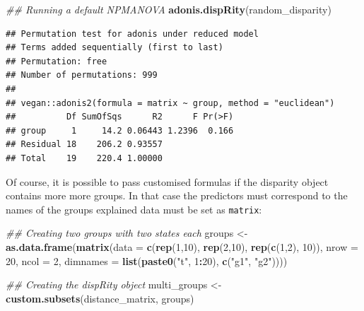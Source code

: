 \documentclass[
]{book}
\newenvironment{Shaded}{\begin{snugshade}}{\end{snugshade}}
\newcommand{\CommentTok}[1]{\textcolor[rgb]{0.56,0.35,0.01}{\textit{#1}}}
\newcommand{\DataTypeTok}[1]{\textcolor[rgb]{0.13,0.29,0.53}{#1}}
\newcommand{\DecValTok}[1]{\textcolor[rgb]{0.00,0.00,0.81}{#1}}
\newcommand{\KeywordTok}[1]{\textcolor[rgb]{0.13,0.29,0.53}{\textbf{#1}}}
\newcommand{\NormalTok}[1]{#1}
\newcommand{\OperatorTok}[1]{\textcolor[rgb]{0.81,0.36,0.00}{\textbf{#1}}}
\newcommand{\StringTok}[1]{\textcolor[rgb]{0.31,0.60,0.02}{#1}}
\begin{document}
\begin{Shaded}
\begin{Highlighting}[]
\CommentTok{\#\# Running a default NPMANOVA}
\KeywordTok{adonis.dispRity}\NormalTok{(random\_disparity)}
\end{Highlighting}
\end{Shaded}

\begin{verbatim}
## Permutation test for adonis under reduced model
## Terms added sequentially (first to last)
## Permutation: free
## Number of permutations: 999
## 
## vegan::adonis2(formula = matrix ~ group, method = "euclidean")
##          Df SumOfSqs      R2      F Pr(>F)
## group     1     14.2 0.06443 1.2396  0.166
## Residual 18    206.2 0.93557              
## Total    19    220.4 1.00000
\end{verbatim}

Of course, it is possible to pass customised formulas if the disparity object contains more more groups.
In that case the predictors must correspond to the names of the groups explained data must be set as \texttt{matrix}:

\begin{Shaded}
\begin{Highlighting}[]
\CommentTok{\#\# Creating two groups with two states each}
\NormalTok{groups \textless{}{-}}\StringTok{ }\KeywordTok{as.data.frame}\NormalTok{(}\KeywordTok{matrix}\NormalTok{(}\DataTypeTok{data =} \KeywordTok{c}\NormalTok{(}\KeywordTok{rep}\NormalTok{(}\DecValTok{1}\NormalTok{,}\DecValTok{10}\NormalTok{),}
                                        \KeywordTok{rep}\NormalTok{(}\DecValTok{2}\NormalTok{,}\DecValTok{10}\NormalTok{),}
                                        \KeywordTok{rep}\NormalTok{(}\KeywordTok{c}\NormalTok{(}\DecValTok{1}\NormalTok{,}\DecValTok{2}\NormalTok{), }\DecValTok{10}\NormalTok{)),}
                        \DataTypeTok{nrow =} \DecValTok{20}\NormalTok{, }\DataTypeTok{ncol =} \DecValTok{2}\NormalTok{,}
                        \DataTypeTok{dimnames =} \KeywordTok{list}\NormalTok{(}\KeywordTok{paste0}\NormalTok{(}\StringTok{"t"}\NormalTok{, }\DecValTok{1}\OperatorTok{:}\DecValTok{20}\NormalTok{),}
                                        \KeywordTok{c}\NormalTok{(}\StringTok{"g1"}\NormalTok{, }\StringTok{"g2"}\NormalTok{))))}

\CommentTok{\#\# Creating the dispRity object}
\NormalTok{multi\_groups \textless{}{-}}\StringTok{ }\KeywordTok{custom.subsets}\NormalTok{(distance\_matrix, groups)}
\end{Highlighting}
\end{Shaded}
\end{document}
